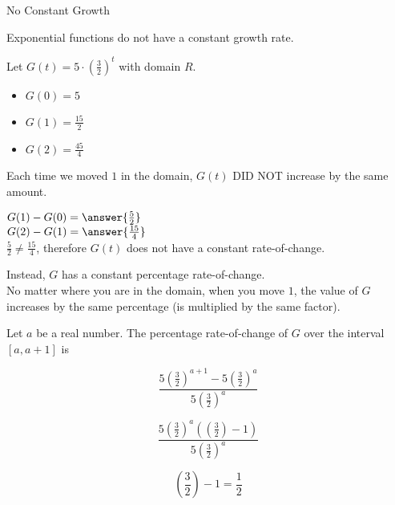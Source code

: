 \documentclass{ximera}
\begin{document}
\begin{fact}  No Constant Growth



Exponential functions do not have a constant growth rate. \\

\begin{explanation}

Let $G(t) = 5 \cdot \left(\frac{3}{2}\right)^t$ with domain \textbf{$R$}. 






\begin{itemize}
\item $G(0) = 5$
\item $G(1) = \frac{15}{2}$
\item $G(2) = \frac{45}{4}$
\end{itemize}



Each time we moved $1$ in the domain, $G(t)$ DID NOT increase by the same amount.

$G(1) - G(0) = \answer{\frac{5}{2}}$ \\

$G(2) - G(1) = \answer{\frac{15}{4}}$ \\

$ \frac{5}{2}  \ne  \frac{15}{4} $, therefore $G(t)$ does not have a constant rate-of-change. \\


\end{explanation}

\end{fact}




Instead, $G$ has a constant percentage rate-of-change. \\

No matter where you are in the domain, when you move $1$, the value of $G$ increases by the same percentage (is multiplied by the same factor).


Let $a$ be a real number.  The percentage rate-of-change of $G$ over the interval $[a,a+1]$ is 



\[    \frac{5 \left(\frac{3}{2}\right)^{a+1} - 5 \left(\frac{3}{2}\right)^a}{5 \left(\frac{3}{2}\right)^a}       \]


\[   \frac{5 \left(\frac{3}{2}\right)^a (\left(\frac{3}{2}\right) - 1) }{5 \left(\frac{3}{2}\right)^a}    \]


\[   \left(\frac{3}{2}\right) - 1 = \frac{1}{2}   \]
\end{document}
